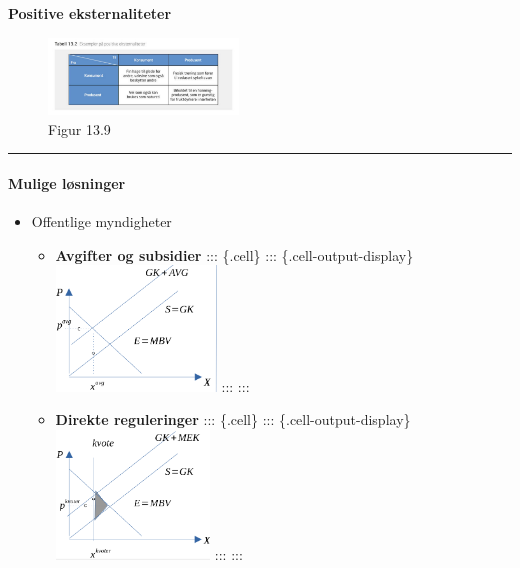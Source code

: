 \documentclass[
  letterpaper,
  DIV=11,
  numbers=noendperiod]{scrartcl}
\let\oldparagraph\paragraph
\renewcommand{\paragraph}[1]{\oldparagraph{#1}\mbox{}}
\providecommand{\tightlist}{%
  \setlength{\itemsep}{0pt}\setlength{\parskip}{0pt}}\usepackage{longtable,booktabs,array}
\begin{document}
\textbf{Positive eksternaliteter}

\begin{figure}[H]

{\centering \includegraphics[width=0.45\textwidth,height=\textheight]{drawio/eks_pos.png}

}

\caption{Figur 13.9}

\end{figure}%

\begin{center}\rule{0.5\linewidth}{0.5pt}\end{center}

\paragraph{Mulige løsninger}\label{mulige-luxf8sninger-1}

\begin{itemize}
\tightlist
\item
  Offentlige myndigheter

  \begin{itemize}
  \tightlist
  \item
    \textbf{Avgifter og subsidier} ::: \{.cell\} :::
    \{.cell-output-display\}
    \includegraphics[width=1.68in,height=0.45\textheight]{drawio/eks_avg.png}
    ::: :::
  \item
    \textbf{Direkte reguleringer} ::: \{.cell\} :::
    \{.cell-output-display\}
    \includegraphics[width=1.61in,height=0.45\textheight]{drawio/eks_kvo.png}
    ::: :::
  \end{itemize}
\end{itemize}
\end{document}

